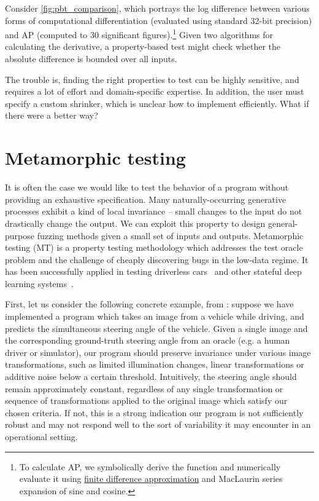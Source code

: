 \documentclass[12pt,initial,twoside,maitrise]{dms}
\numberwithin{equation}{section}
\numberwithin{table}{chapter}
\numberwithin{figure}{chapter}
\begin{document}
%
Consider \autoref{fig:pbt_comparison}, which portrays the log difference between various forms of computational differentiation (evaluated using standard 32-bit precision) and AP (computed to 30 significant figures).\hspace{-.08em}\footnote{To calculate AP, we symbolically derive the function and numerically evaluate it using \hyperref[sec:fdm]{finite difference approximation} and MacLaurin series expansion of sine and cosine.} Given two algorithms for calculating the derivative, a property-based test might check whether the absolute difference is bounded over all inputs.

The trouble is, finding the right properties to test can be highly sensitive, and requires a lot of effort and domain-specific expertise. In addition, the user must specify a custom shrinker, which is unclear how to implement efficiently. What if there were a better way?

\section{Metamorphic testing}\label{subsec:metamorphic-testing}

It is often the case we would like to test the behavior of a program without providing an exhaustive specification. Many naturally-occurring generative processes exhibit a kind of local invariance -- small changes to the input do not drastically change the output. We can exploit this property to design general-purpose fuzzing methods given a small set of inputs and outputs. Metamorphic testing (MT) is a property testing methodology which addresses the test oracle problem and the challenge of cheaply discovering bugs in the low-data regime. It has been successfully applied in testing driverless cars~\citep{zhou2019metamorphic, pei2017deepxplore, tian2018deeptest} and other stateful deep learning systems~\citep{du2018deepcruiser}.

First, let us consider the following concrete example, from \citet{tian2018deeptest}: suppose we have implemented a program which takes an image from a vehicle while driving, and predicts the simultaneous steering angle of the vehicle. Given a single image and the corresponding ground-truth steering angle from an oracle (e.g. a human driver or simulator), our program should preserve invariance under various image transformations, such as limited illumination changes, linear transformations or additive noise below a certain threshold. Intuitively, the steering angle should remain approximately constant, regardless of any single transformation or sequence of transformations applied to the original image which satisfy our chosen criteria. If not, this is a strong indication our program is not sufficiently robust and may not respond well to the sort of variability it may encounter in an operational setting.
\end{document}

